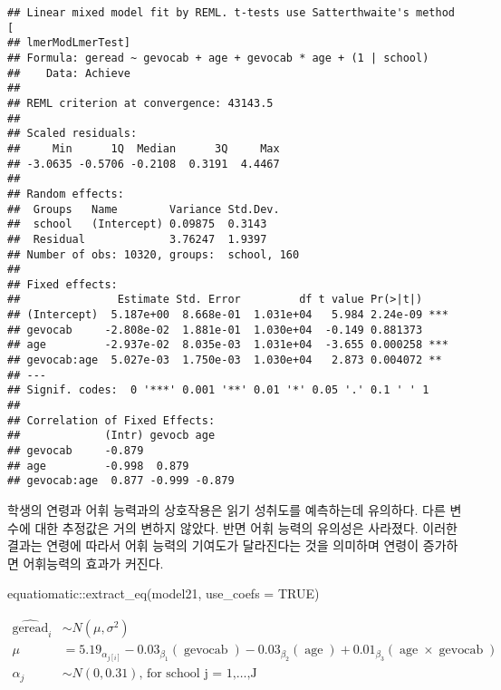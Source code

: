 \documentclass[
]{book}
\newenvironment{Shaded}{\begin{snugshade}}{\end{snugshade}}
\newcommand{\AttributeTok}[1]{\textcolor[rgb]{0.77,0.63,0.00}{#1}}
\newcommand{\ConstantTok}[1]{\textcolor[rgb]{0.00,0.00,0.00}{#1}}
\newcommand{\FunctionTok}[1]{\textcolor[rgb]{0.00,0.00,0.00}{#1}}
\newcommand{\NormalTok}[1]{#1}
\newcommand{\SpecialCharTok}[1]{\textcolor[rgb]{0.00,0.00,0.00}{#1}}
\begin{document}
\begin{verbatim}
## Linear mixed model fit by REML. t-tests use Satterthwaite's method [
## lmerModLmerTest]
## Formula: geread ~ gevocab + age + gevocab * age + (1 | school)
##    Data: Achieve
## 
## REML criterion at convergence: 43143.5
## 
## Scaled residuals: 
##     Min      1Q  Median      3Q     Max 
## -3.0635 -0.5706 -0.2108  0.3191  4.4467 
## 
## Random effects:
##  Groups   Name        Variance Std.Dev.
##  school   (Intercept) 0.09875  0.3143  
##  Residual             3.76247  1.9397  
## Number of obs: 10320, groups:  school, 160
## 
## Fixed effects:
##               Estimate Std. Error         df t value Pr(>|t|)    
## (Intercept)  5.187e+00  8.668e-01  1.031e+04   5.984 2.24e-09 ***
## gevocab     -2.808e-02  1.881e-01  1.030e+04  -0.149 0.881373    
## age         -2.937e-02  8.035e-03  1.031e+04  -3.655 0.000258 ***
## gevocab:age  5.027e-03  1.750e-03  1.030e+04   2.873 0.004072 ** 
## ---
## Signif. codes:  0 '***' 0.001 '**' 0.01 '*' 0.05 '.' 0.1 ' ' 1
## 
## Correlation of Fixed Effects:
##             (Intr) gevocb age   
## gevocab     -0.879              
## age         -0.998  0.879       
## gevocab:age  0.877 -0.999 -0.879
\end{verbatim}

학생의 연령과 어휘 능력과의 상호작용은 읽기 성취도를 예측하는데 유의하다. 다른 변수에 대한 추정값은 거의 변하지 않았다. 반면 어휘 능력의 유의성은 사라졌다. 이러한 결과는 연령에 따라서 어휘 능력의
기여도가 달라진다는 것을 의미하며 연령이 증가하면 어휘능력의 효과가 커진다.

\begin{Shaded}
\begin{Highlighting}[]
\NormalTok{equatiomatic}\SpecialCharTok{::}\FunctionTok{extract\_eq}\NormalTok{(model21, }\AttributeTok{use\_coefs =} \ConstantTok{TRUE}\NormalTok{)}
\end{Highlighting}
\end{Shaded}

\[
\begin{aligned}
  \operatorname{\widehat{geread}}_{i}  &\sim N \left(\mu, \sigma^2 \right) \\
    \mu &=5.19_{\alpha_{j[i]}} - 0.03_{\beta_{1}}(\operatorname{gevocab}) - 0.03_{\beta_{2}}(\operatorname{age}) + 0.01_{\beta_{3}}(\operatorname{age} \times \operatorname{gevocab}) \\
    \alpha_{j}  &\sim N \left(0, 0.31 \right)
    \text{, for school j = 1,} \dots \text{,J}
\end{aligned}
\]
\end{document}
